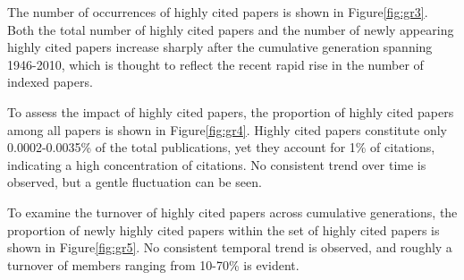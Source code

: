 The number of occurrences of highly cited papers is shown in Figure\ref{fig:gr3}.
Both the total number of highly cited papers and the number of newly appearing highly cited papers increase sharply after the cumulative generation spanning 1946-2010, which is thought to reflect the recent rapid rise in the number of indexed papers.

To assess the impact of highly cited papers, the proportion of highly cited papers among all papers is shown in Figure\ref{fig:gr4}.
Highly cited papers constitute only 0.0002-0.0035\% of the total publications, yet they account for 1\% of citations, indicating a high concentration of citations. No consistent trend over time is observed, but a gentle fluctuation can be seen.

To examine the turnover of highly cited papers across cumulative generations, the proportion of newly highly cited papers within the set of highly cited papers is shown in Figure\ref{fig:gr5}. No consistent temporal trend is observed, and roughly a turnover of members ranging from 10-70\% is evident.
